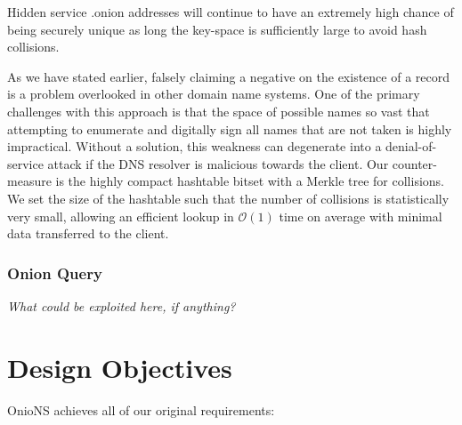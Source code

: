 Hidden service .onion addresses will continue to have an extremely high chance of being securely unique as long the key-space is sufficiently large to avoid hash collisions.

As we have stated earlier, falsely claiming a negative on the existence of a record is a problem overlooked in other domain name systems. One of the primary challenges with this approach is that the space of possible names so vast that attempting to enumerate and digitally sign all names that are not taken is highly impractical. Without a solution, this weakness can degenerate into a denial-of-service attack if the DNS resolver is malicious towards the client. Our counter-measure is the highly compact hashtable bitset with a Merkle tree for collisions. We set the size of the hashtable such that the number of collisions is statistically very small, allowing an efficient lookup in $ \mathcal{O}(1) $ time on average with minimal data transferred to the client.

\subsubsection{Onion Query}

\emph{What could be exploited here, if anything?}

\section{Design Objectives}

OnioNS achieves all of our original requirements:


